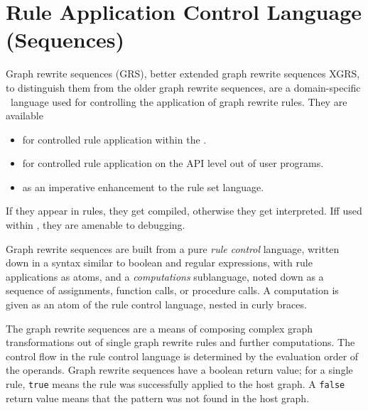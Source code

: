 \chapter{Rule Application Control Language (Sequences)}
\label{cha:xgrs}

Graph rewrite sequences (GRS), better extended graph rewrite sequences XGRS, to distinguish them from the older graph rewrite sequences, are a domain-specific \GrG~language used for controlling the application of graph rewrite rules. 
They are available
\begin{itemize}
\item for controlled rule application within the \GrShell.
\item for controlled rule application on the API level out of user programs.
\item as an imperative enhancement to the rule set language.
\end{itemize}

If they appear in rules, they get compiled, otherwise they get interpreted.
Iff used within \GrShell, they are amenable to debugging.

Graph rewrite sequences are built from a pure \emph{rule control} language,
written down in a syntax similar to boolean and regular expressions, with rule applications as atoms,
and a \emph{computations} sublanguage,
noted down as a sequence of assignments, function calls, or procedure calls.
A computation is given as an atom of the rule control language, nested in curly braces.

The graph rewrite sequences are a means of composing complex graph transformations out of single graph rewrite rules and further computations.
The control flow in the rule control language is determined by the evaluation order of the operands.
Graph rewrite sequences have a boolean return value; for a single rule, \texttt{true} means the rule was successfully applied to the host graph.
A \texttt{false} return value means that the pattern was not found in the host graph. 

